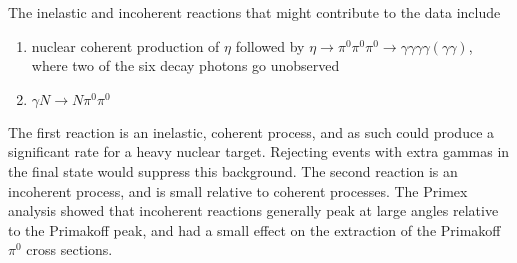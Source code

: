 The inelastic and incoherent reactions that might contribute to the
data include
\begin{enumerate}[label=(\roman*)]
    \item nuclear coherent production of $\eta$ followed by $\eta\rightarrow \pi^0\pi^0\pi^0 \rightarrow \gamma\gamma\gamma\gamma(\gamma\gamma)$, where two of the six decay photons go unobserved
    \item $\gamma N \rightarrow N \pi^0\pi^0$
\end{enumerate}

The first reaction is an inelastic, coherent process, and as such
could produce a significant rate for a heavy nuclear target. Rejecting
events with extra gammas in the final state would suppress this
background.  The second reaction is an incoherent process, and is
small relative to coherent processes.  The Primex analysis showed that
incoherent reactions generally peak at large angles relative to the
Primakoff peak, and had a small effect on the extraction of the
Primakoff $\pi^0$ cross sections.